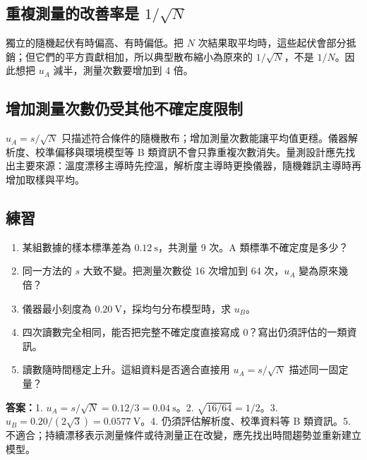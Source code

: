\documentclass[11pt,a4paper]{article}
\providecommand{\tightlist}{%
  \setlength{\itemsep}{0pt}\setlength{\parskip}{0pt}}
\begin{document}
\subsection{\texorpdfstring{重複測量的改善率是 \(1/\sqrt N\)}{重複測量的改善率是 1/\textbackslash sqrt N}}\label{ux91cdux8907ux6e2cux91cfux7684ux6539ux5584ux7387ux662f-1sqrt-n}

獨立的隨機起伏有時偏高、有時偏低。把 \(N\) 次結果取平均時，這些起伏會部分抵銷；但它們的平方貢獻相加，所以典型散布縮小為原來的 \(1/\sqrt N\)，不是 \(1/N\)。因此想把 \(u_A\) 減半，測量次數要增加到 4 倍。

\subsection{增加測量次數仍受其他不確定度限制}\label{ux589eux52a0ux6e2cux91cfux6b21ux6578ux4ecdux53d7ux5176ux4ed6ux4e0dux78baux5b9aux5ea6ux9650ux5236}

\(u_A=s/\sqrt N\) 只描述符合條件的隨機散布；增加測量次數能讓平均值更穩。儀器解析度、校準偏移與環境模型等 B 類資訊不會只靠重複次數消失。量測設計應先找出主要來源：溫度漂移主導時先控溫，解析度主導時更換儀器，隨機雜訊主導時再增加取樣與平均。

\begin{HandoutSelfCheck}

\subsection{練習}\label{ux7df4ux7fd2-2}

\begin{enumerate}
\def\labelenumi{\arabic{enumi}.}
\tightlist
\item
  某組數據的樣本標準差為 \(0.12\ \mathrm{s}\)，共測量 9 次。A 類標準不確定度是多少？
\item
  同一方法的 \(s\) 大致不變。把測量次數從 16 次增加到 64 次，\(u_A\) 變為原來幾倍？
\item
  儀器最小刻度為 \(0.20\ \mathrm{V}\)，採均勻分布模型時，求 \(u_B\)。
\item
  四次讀數完全相同，能否把完整不確定度直接寫成 0？寫出仍須評估的一類資訊。
\item
  讀數隨時間穩定上升。這組資料是否適合直接用 \(u_A=s/\sqrt N\) 描述同一固定量？
\end{enumerate}

\textbf{答案：}1. \(u_A=s/\sqrt N=0.12/3=0.04\ \mathrm{s}\)。2. \(\sqrt{16/64}=1/2\)。3. \(u_B=0.20/(2\sqrt3)=0.0577\ \mathrm{V}\)。4. 仍須評估解析度、校準資料等 B 類資訊。5. 不適合；持續漂移表示測量條件或待測量正在改變，應先找出時間趨勢並重新建立模型。

\end{HandoutSelfCheck}
\end{document}
